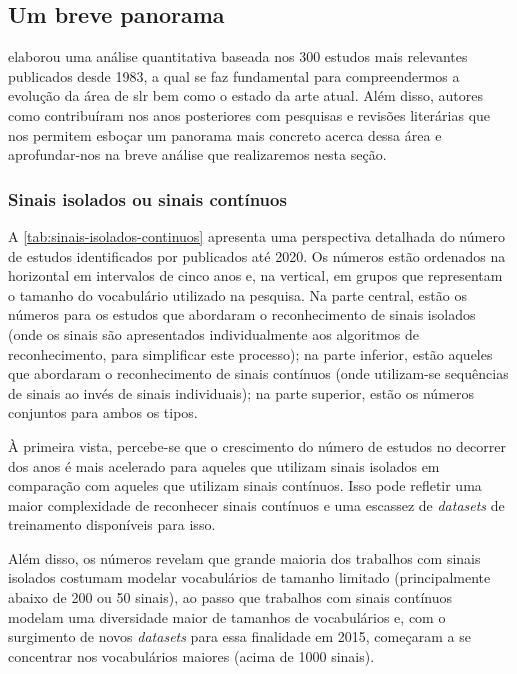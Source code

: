 \subsection{Um breve panorama}
\label{sec:slr-breve-panorama}

 elaborou uma análise quantitativa baseada nos 300 estudos mais relevantes publicados desde 1983, a qual se faz fundamental para compreendermos a evolução da área de \acrshort{slr} bem como o estado da arte atual. Além disso, autores como  contribuíram nos anos posteriores com pesquisas e revisões literárias que nos permitem esboçar um panorama mais concreto acerca dessa área e aprofundar-nos na breve análise que realizaremos nesta seção.



\subsubsection{Sinais isolados ou sinais contínuos}
\label{sec:slr-sinais-isolados-continuos}

A \autoref{tab:sinais-isolados-continuos} apresenta uma perspectiva detalhada do número de estudos identificados por  publicados até 2020. Os números estão ordenados na horizontal em intervalos de cinco anos e, na vertical, em grupos que representam o tamanho do vocabulário utilizado na pesquisa. Na parte central, estão os números para os estudos que abordaram o reconhecimento de sinais isolados (onde os sinais são apresentados individualmente aos algoritmos de reconhecimento, para simplificar este processo); na parte inferior, estão aqueles que abordaram o reconhecimento de sinais contínuos (onde utilizam-se sequências de sinais ao invés de sinais individuais); na parte superior, estão os números conjuntos para ambos os tipos.



À primeira vista, percebe-se que o crescimento do número de estudos no decorrer dos anos é mais acelerado para aqueles que utilizam sinais isolados em comparação com aqueles que utilizam sinais contínuos. Isso pode refletir uma maior complexidade de reconhecer sinais contínuos e uma escassez de \textit{datasets} de treinamento disponíveis para isso. 

Além disso, os números revelam que grande maioria dos trabalhos com sinais isolados costumam modelar vocabulários de tamanho limitado (principalmente abaixo de 200 ou 50 sinais), ao passo que trabalhos com sinais contínuos modelam uma diversidade maior de tamanhos de vocabulários e, com o surgimento de novos \textit{datasets} para essa finalidade em 2015, começaram a se concentrar nos vocabulários maiores (acima de 1000 sinais).



